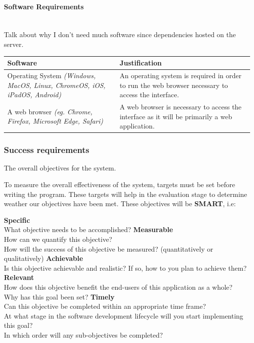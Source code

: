 \documentclass{article}
\begin{document}
\paragraph{Software Requirements\\\\}

Talk about why I don't need much software since dependencies hosted on the server.\\

\begin{tabular}{ |p{}|p{}| }
    \hline
    \textbf{Software} & \textbf{Justification}\\
    \hline
    Operating System \newline
    \textit{(Windows, MacOS, Linux, ChromeOS, iOS, iPadOS, Android)} &
    An operating system is required in order to run the web browser necessary to access the interface. \\
    \hline
    A web browser \newline
    \textit{(eg. Chrome, Firefox, Microsoft Edge, Safari)} &
    A web browser is necessary to access the interface as it will be primarily a web application.\\
    \hline
\end{tabular}

\pagebreak

\subsubsection{Success requirements}

The overall objectives for the system.

\noindent To measure the overall effectiveness of the system, targets must be set before writing the program.
These targets will help in the evaluation stage to determine weather our objectives have been met.
These objectives will be \textbf{SMART}, i.e:

\begin{outline}
    \1 \textbf{Specific}\\
    What objective needs to be accomplished?
    \1 \textbf{Measurable}\\
    How can we quantify this objective?\\
    How will the success of this objective be measured? (quantitatively or qualitatively)
    \1 \textbf{Achievable}\\
    Is this objective achievable and realistic? If so, how to you plan to achieve them?
    \1 \textbf{Relevant}\\
    How does this objective benefit the end-users of this application as a whole?\\
    Why has this goal been set?
    \1 \textbf{Timely}\\
    Can this objective be completed within an appropriate time frame?\\
    At what stage in the software development lifecycle will you start implementing this goal?\\
    In which order will any sub-objectives be completed? 
\end{outline}
\end{document}
